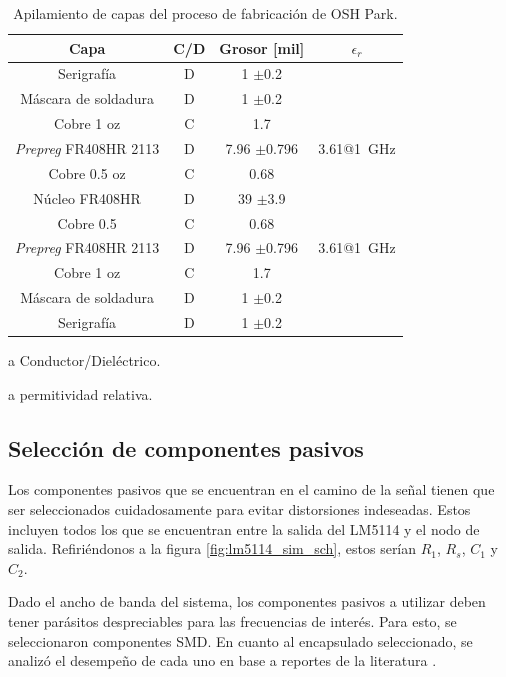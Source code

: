 \begin{table}[htbp]
\centering
\begin{threeparttable}[b]
    \begin{tabular}{c|c|c|c}
        Capa & C/D \tnote{a} & Grosor [mil]  & $\epsilon_r$ \tnote{b} \\
        \hline
        Serigrafía & D & 1 $\pm$0.2 & \\
        Máscara de soldadura & D & 1 $\pm$0.2 & \\
        Cobre 1 oz & C & 1.7 \\
        \textit{Prepreg} FR408HR 2113  & D & 7.96 $\pm$0.796 &
        3.61@\qty{1}{\giga\hertz} \\
        Cobre 0.5 oz & C & 0.68 & \\
        Núcleo FR408HR & D & 39 $\pm$3.9 & \\
        Cobre 0.5 & C & 0.68 \\
        \textit{Prepreg} FR408HR 2113 & D & 7.96 $\pm$0.796 &
        3.61@\qty{1}{\giga\hertz}\\
        Cobre 1 oz & C & 1.7 & \\
        Máscara de soldadura & D & 1 $\pm$0.2 & \\
        Serigrafía & D & 1 $\pm$0.2 & \\
    \end{tabular}
    \begin{tablenotes}
        \item [a] Conductor/Dieléctrico.
        \item [a] permitividad relativa.
    \end{tablenotes}
\end{threeparttable}
\caption{Apilamiento de capas del proceso de fabricación de OSH Park.}
\label{tab:oshpark_4_layer_stackup}
\end{table}

\subsection{Selección de componentes pasivos}

Los componentes pasivos que se encuentran en el camino de la señal tienen que
ser seleccionados cuidadosamente para evitar distorsiones indeseadas. Estos
incluyen todos los que se encuentran entre la salida del LM5114 y el nodo de
salida. Refiriéndonos a la figura \ref{fig:lm5114_sim_sch}, estos serían $R_1$,
$R_s$, $C_1$ y $C_2$.

Dado el ancho de banda del sistema, los componentes pasivos a utilizar deben
tener parásitos despreciables para las frecuencias de interés. Para esto, se
seleccionaron componentes SMD. En cuanto al encapsulado seleccionado, se analizó
el desempeño de cada uno en base a reportes de la literatura
\cite{vishayFreqResp}.

